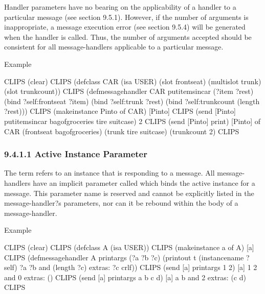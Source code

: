 \documentclass[letterpaper,10pt,english]{sphinxmanual}
\begin{document}
Handler parameters have no bearing on the applicability of a handler to
a particular message (see section 9.5.1). However, if the number of
arguments is inappropriate, a message execution error (see section
9.5.4) will be generated when the handler is called. Thus, the number of
arguments accepted should be consistent for all message-handlers
applicable to a particular message.

Example

\begin{sphinxVerbatim}[commandchars=\\\{\}]
CLIPS\PYGZgt{} (clear)
CLIPS\PYGZgt{}
(defclass CAR (is\PYGZhy{}a USER)
  (slot front\PYGZhy{}seat)
  (multislot trunk)
  (slot trunk\PYGZhy{}count))
CLIPS\PYGZgt{}
(defmessage\PYGZhy{}handler CAR put\PYGZhy{}items\PYGZhy{}in\PYGZhy{}car (?item \PYGZdl{}?rest)
  (bind ?self:front\PYGZhy{}seat ?item)
  (bind ?self:trunk ?rest)
  (bind ?self:trunk\PYGZhy{}count (length\PYGZdl{} ?rest)))
CLIPS\PYGZgt{} (make\PYGZhy{}instance Pinto of CAR)
[Pinto]
CLIPS\PYGZgt{} (send [Pinto] put\PYGZhy{}items\PYGZhy{}in\PYGZhy{}car bag\PYGZhy{}of\PYGZhy{}groceries tire suitcase)
2
CLIPS\PYGZgt{} (send [Pinto] print)
[Pinto] of CAR
(front\PYGZhy{}seat bag\PYGZhy{}of\PYGZhy{}groceries)
(trunk tire suitcase)
(trunk\PYGZhy{}count 2)
CLIPS\PYGZgt{}
\end{sphinxVerbatim}


\subsubsection{9.4.1.1 Active Instance Parameter}
\label{\detokenize{cool:active-instance-parameter}}
The term  refers to an instance that is responding to
a message. All message-handlers have an implicit parameter called
 which binds the active instance for a message. This parameter
name is reserved and cannot be explicitly listed in the
message-handler?s parameters, nor can it be rebound within the body of a
message-handler.

Example

\begin{sphinxVerbatim}[commandchars=\\\{\}]
CLIPS\PYGZgt{} (clear)
CLIPS\PYGZgt{} (defclass A (is\PYGZhy{}a USER))
CLIPS\PYGZgt{} (make\PYGZhy{}instance a of A)
[a]
CLIPS\PYGZgt{}
(defmessage\PYGZhy{}handler A print\PYGZhy{}args (?a ?b \PYGZdl{}?c)
  (printout t (instance\PYGZhy{}name ?self) \PYGZdq{} \PYGZdq{} ?a \PYGZdq{} \PYGZdq{} ?b
   \PYGZdq{} and \PYGZdq{} (length\PYGZdl{} ?c) \PYGZdq{} extras: \PYGZdq{} ?c crlf))
CLIPS\PYGZgt{} (send [a] print\PYGZhy{}args 1 2)
[a] 1 2 and 0 extras: ()
CLIPS\PYGZgt{} (send [a] print\PYGZhy{}args a b c d)
[a] a b and 2 extras: (c d)
CLIPS\PYGZgt{}
\end{sphinxVerbatim}
\end{document}
